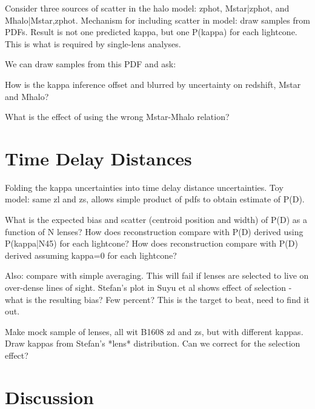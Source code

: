 \documentclass[useAMS,usenatbib]{mn2e}
\begin{document}
Consider three sources of scatter in the halo model: zphot, Mstar|zphot, and
Mhalo|Mstar,zphot. Mechanism for including scatter in model: draw samples from
PDFs. Result is not one predicted kappa, but one P(kappa) for each lightcone.
This is what is required by single-lens analyses. 

We can draw samples from this PDF and ask:

How is the kappa inference offset and blurred by uncertainty on redshift, Mstar
and Mhalo? 

What is the effect of using the wrong Mstar-Mhalo relation? 



\section{Time Delay Distances}
\label{sec:} 

Folding the kappa uncertainties into time delay distance uncertainties. Toy
model: same zl and zs, allows simple product of pdfs to obtain estimate of P(D).

What is the expected bias and scatter (centroid position and width) of P(D) as a
function of N lenses? How does reconstruction compare with P(D) derived using
P(kappa|N45) for each lightcone? How does reconstruction compare with P(D)
derived assuming kappa=0 for each lightcone?

Also: compare with simple averaging. This will fail if lenses are selected to
live on over-dense lines of sight. Stefan's plot in Suyu et al shows effect of
selection - what is the resulting bias? Few percent? This is the target to beat,
need to find it out.

Make mock sample of lenses, all wit B1608 zd and zs, but with different kappas.
Draw kappas from Stefan's *lens* distribution. Can we correct for the selection
effect?





\section{Discussion}
\label{sec:discuss}
\end{document}
